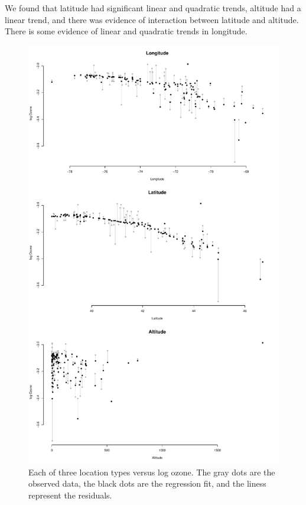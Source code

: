 \documentclass[12pt]{article}
\begin{document}
We found that latitude had significant linear and quadratic trends, altitude had a linear trend, and there was evidence of interaction between latitude and altitude. There is some evidence of linear and quadratic trends in longitude.

\begin{figure}
\begin{center}
\includegraphics[scale=0.5]{figs/regression.pdf}
\end{center}
\caption{Each of three location types versus log ozone. The gray dots are the observed data, the black dots are the regression fit, and the liness represent the residuals.}
\end{figure}
\end{document}
